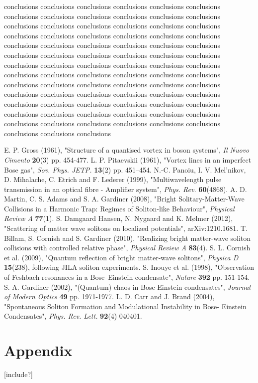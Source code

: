 \documentclass[10pt, twocolumn]{revtex4}    %
\begin{document}
conclusions conclusions conclusions conclusions conclusions conclusions conclusions conclusions conclusions conclusions conclusions conclusions conclusions conclusions conclusions conclusions conclusions conclusions conclusions conclusions conclusions conclusions conclusions conclusions conclusions conclusions conclusions conclusions conclusions conclusions conclusions conclusions conclusions conclusions conclusions conclusions conclusions conclusions conclusions conclusions conclusions conclusions conclusions conclusions conclusions conclusions conclusions conclusions conclusions conclusions conclusions conclusions conclusions conclusions conclusions conclusions conclusions conclusions conclusions conclusions conclusions conclusions conclusions conclusions conclusions conclusions conclusions conclusions conclusions conclusions conclusions conclusions conclusions conclusions conclusions conclusions conclusions conclusions conclusions conclusions conclusions 


\begin{thebibliography}{}

 E. P. Gross (1961), "Structure of a quantised vortex in boson systems", \textit{Il Nuovo Cimento} 				\textbf{20}(3) pp. 454-477. 
  L. P. Pitaevskii (1961), "Vortex lines in an imperfect Bose gas", \textit{Sov. Phys. JETP.} \textbf{13}(2) 		pp. 451–454.
 N.-C. Panoiu, I. V. Mel’nikov, D. Mihalache, C. Etrich and F. Lederer (1999), "Multiwavelength pulse 			transmission in an optical fibre - Amplifier system", \textit{Phys. Rev.} \textbf{60}(4868). %
 A. D. Martin, C. S. Adams and S. A. Gardiner (2008), "Bright Solitary-Matter-Wave Collisions in a Harmonic 		Trap: Regimes of Soliton-like Behaviour", \textit{Physical Review A} \textbf{77}(1). %
 S. Damgaard Hansen, N. Nygaard and K. Mølmer (2012), "Scattering of matter wave solitons on 			localized potentials", arXiv:1210.1681. %
 T. Billam, S. Cornish and S. Gardiner (2010), "Realizing bright matter-wave soliton collisions with 				controlled relative phase", \textit{Physical Review A} \textbf{83}(4). %
 S. L. Cornish et al. (2009), "Quantum reflection of bright matter-wave solitons", \textit{Physica D} 			\textbf{15}(238), following JILA soliton experiments. 
 S. Inouye et al. (1998), "Observation of Feshbach resonances in a Bose–Einstein condensate", 				\textit{Nature} \textbf{392} pp. 151-154. 
 S. A. Gardiner (2002), "(Quantum) chaos in Bose-Einstein condensates", \textit{Journal of Modern Optics} 	\textbf{49} pp. 1971-1977.
 L. D. Carr and J. Brand (2004), "Spontaneous Soliton Formation and Modulational Instability in Bose-			Einstein Condensates", \textit{Phys. Rev. Lett.} \textbf{92}(4) 040401. %

\end{thebibliography} 


\section{Appendix} \label{Appendix}

[include?]
\end{document}
